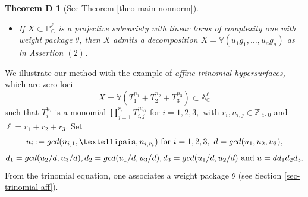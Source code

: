 \documentclass[11pt, reqno]{amsart}
\theoremstyle{plain}
\newtheorem*{thmD}{Theorem D}
\theoremstyle{definition}
\theoremstyle{remark}
\begin{document}
\begin{thmD}[See  Theorem \ref{theo-main-nonnorm}]
\begin{itemize}
and assume that there exist Laurent monomials $u_{i}\in \mathbb{C}[T_{0}, T_{0}^{-1}, \ldots, T_{\ell}, T_{\ell}^{-1}]$ 
such that $X:= \mathbb{V}(u_{1}g_{1}, \ldots, u_{a}g_{a})\subset \mathbb{P}^{\ell}_{\mathbb{C}}$ is irreducible. Then $X$ is a subvariety with linear torus action of complexity one and its normalization is described by the divisorial fan $\mathscr{E}_{\theta}$ obtained from Contruction $(1)$. 
\item[$(3)$] If $X \subset \mathbb{P}^{\ell}_{\mathbb{C}}$ is a projective subvariety with linear torus of complexity one with weight package $\theta$, then $X$ admits a decomposition $X  =  \mathbb{V}(u_{1}g_{1}, \ldots, u_{a}g_{a})$ as in Assertion $(2)$. 
\end{itemize}
\end{thmD}
We  illustrate our method with the example of \emph{affine trinomial hypersurfaces,} which are zero loci
$$X  =  \mathbb{V}(T_{1}^{\underline{n}_{1}} + T_{2}^{\underline{n}_{2}} + T_{3}^{\underline{n}_{3}}) \subset \mathbb{A}_{\mathbb{C}}^{\ell}$$
such that $T_{i}^{\underline{n}_{i}}$ is a monomial
$ \prod_{j = 1}^{r_{i}} T_{i, j}^{n_{i,j}} \text{ for } i = 1,2,3,$ with
$r_{i}, n_{i,j}\in\mathbb{Z}_{>0}$ and $\ell =  r_{1} + r_{2} + r_{3}$. 
Set
$$ u_{i}:= {\rm gcd}(n_{i,1}, \ldots, n_{i, r_{i}}) \text{ for } i = 1,2,3, \,\, d =  {\rm gcd}(u_{1}, u_{2}, u_{3}),$$
$$ d_{1}  =  {\rm gcd}(u_{2}/d, u_{3}/d), d_{2}  =  {\rm gcd}(u_{1}/d, u_{3}/d), d_{3}  =  {\rm gcd}(u_{1}/d, u_{2}/d) \text{ and } u = dd_{1}d_{2}d_{3}.$$ From the  trinomial equation, one associates a weight package $\theta$ (see Section \ref{sec-trinomial-aff}). 
\end{document}
